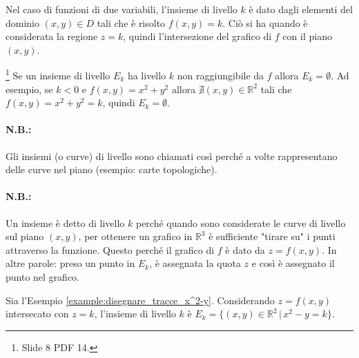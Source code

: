 \begin{remark}
    Nel caso di funzioni di due variabili, l'insieme di livello $k$ è dato dagli elementi del dominio $(x,y)\in D$ tali che è risolto $f(x,y)=k$. Ciò si ha quando è considerata la regione $z=k$, quindi l'intersezione del grafico di $f$ con il piano $(x,y)$.
\end{remark}

\begin{remark}\footnote{Slide 8 PDF 14.}
    Se un insieme di livello $E_k$ ha livello $k$ non raggiungibile da $f$ allora $E_k=\emptyset$. Ad esempio, se $k<0$ e $f(x,y)=x^2+y^2$ allora $\nexists(x,y)\in\mathbb R^2$ tali che $f(x,y)=x^2+y^2=k$, quindi $E_k=\emptyset$.
\end{remark}

\paragraph{N.B.:} Gli insiemi (o curve) di livello sono chiamati così perché a volte rappresentano delle curve nel piano (esempio: carte topologiche).

\paragraph{N.B.:} Un insieme è detto di livello $k$ perché quando sono considerate le curve di livello sul piano $(x,y)$, per ottenere un grafico in $\mathbb R^3$ è sufficiente "tirare su" i punti attraverso la funzione. Questo perché il grafico di $f$ è dato da $z=f(x,y)$. In altre parole: preso un punto in $E_k$, è assegnata la quota $z$ e così è assegnato il punto nel grafico.

\begin{example}
    Sia l'Esempio \ref{example:disegnare_tracce_x^2-y}. Considerando $z=f(x,y)$ intersecato con $z=k$, l'insieme di livello $k$ è $E_k=\{(x,y)\in\mathbb R^2\,|\, x^2-y=k\}$.
\end{example}

